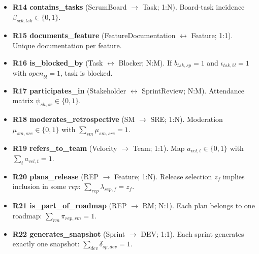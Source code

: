 \documentclass[11pt,a4paper]{article}
\begin{document}
\begin{itemize}[leftmargin=2em,itemsep=0.6em]
  \item \textbf{R14 contains\_tasks} (ScrumBoard $\to$ Task; 1:N). Board-task incidence $\beta_{scb,tsk}\in\{0,1\}$.
  \item \textbf{R15 documents\_feature} (FeatureDocumentation $\leftrightarrow$ Feature; 1:1). Unique documentation per feature.
  \item \textbf{R16 is\_blocked\_by} (Task $\leftrightarrow$ Blocker; N:M). If $b_{tsk,sp}=1$ and $\iota_{tsk,bl}=1$ with $\textit{open}_{bl}=1$, task is blocked.
  \item \textbf{R17 participates\_in} (Stakeholder $\leftrightarrow$ SprintReview; N:M). Attendance matrix $\psi_{sh,sr}\in\{0,1\}$.
  \item \textbf{R18 moderates\_retrospective} (SM $\to$ SRE; 1:N). Moderation $\mu_{sm,sre}\in\{0,1\}$ with $\sum_{sm}\mu_{sm,sre}=1$.
  \item \textbf{R19 refers\_to\_team} (Velocity $\to$ Team; 1:1). Map $a_{vel,t}\in\{0,1\}$ with $\sum_{t}a_{vel,t}=1$.
  \item \textbf{R20 plans\_release} (REP $\to$ Feature; 1:N). Release selection $z_f$ implies inclusion in some $rep$: $\sum_{rep}\lambda_{rep,f} = z_f$.
  \item \textbf{R21 is\_part\_of\_roadmap} (REP $\to$ RM; N:1). Each plan belongs to one roadmap: $\sum_{rm}\pi_{rep,rm}=1$.
  \item \textbf{R22 generates\_snapshot} (Sprint $\to$ DEV; 1:1). Each sprint generates exactly one snapshot: $\sum_{dev}\delta_{sp,dev}=1$.
\end{itemize}
\end{document}
